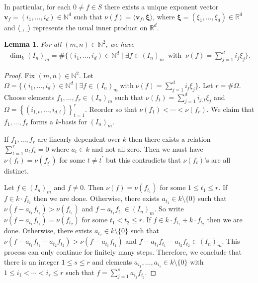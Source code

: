\documentclass[12pt,a4paper]{amsart}
\theoremstyle{plain}
\newtheorem{lemma}[theorem]{Lemma}
\theoremstyle{definition}
\numberwithin{equation}{theorem}
\begin{document}
In particular, for each $0\neq f\in S$ there exists a unique exponent vector $\mathbf{v}_f = (i_1,\ldots,i_d)\in \mathbb{N}^d$ such that $\nu(f) = \langle \mathbf{v}_f, \boldsymbol{\xi}\rangle$, where $\boldsymbol{\xi}=(\xi_1,\ldots,\xi_d)\in\mathbb{R}^d$ and $\langle\_ ,\_\rangle$ represents the usual inner product on $\mathbb{R}^d$.

\begin{lemma}\label{lem_count}
For all $(m,n)\in\mathbb{N}^2$, we have
\begin{align*}
 \dim_k {\left(I_n\right)}_m = \# \Big\{(i_1,\ldots,i_d) \in \mathbb{N}^{d} \mid \exists f\in {\left(I_n\right)}_m\;\;\text{with}\;\;\nu(f)=\sum_{j=1}^d i_j\xi_j\Big\}.
\end{align*}
\end{lemma}
\begin{proof}
Fix $(m,n)\in\mathbb{N}^2$. Let $\Omega = \big\{(i_1,\ldots,i_d) \in \mathbb{N}^{d} \mid \exists f\in {\left(I_n\right)}_m\;\text{with}\;\nu(f)=\sum_{j=1}^d i_j\xi_j\big\}$. Let $r=\#\Omega$. Choose elements $f_1,\ldots,f_r \in {\left(I_n\right)}_m$ such that $\nu(f_t) = \sum_{j=1}^d i_{j,t}\xi_j$ and $\Omega = \left\{(i_{1,t},\ldots,i_{d,t})\right\}_{t=1}^r$. Reorder so that $\nu(f_1)<\cdots<\nu(f_r)$. We claim that $f_1,\ldots,f_r$ forms a $k$-basis for ${\left(I_n\right)}_m$.

If $f_1,\ldots,f_r$ are linearly dependent over $k$ then there exists a relation $\sum_{t=1}^r a_tf_t = 0$ where $a_t\in k$ and not all zero. Then we must have $\nu(f_t)=\nu(f_{t^{\prime}})$ for some $t\neq t^{\prime}$ but this contradicts that $\nu(f_t)$'s are all distinct.

Let $f\in {\left(I_n\right)}_m$ and $f\neq 0$. Then $\nu(f)=\nu(f_{t_1})$ for some $1\leq t_1\leq r$. If $f\in k\cdot  f_{t_1}$ then we are done. Otherwise, there exists $a_{t_1}\in k\setminus \{0\}$ such that $\nu(f-a_{t_1}f_{t_1})>\nu(f_{t_1})$ and $f-a_{t_1}f_{t_1} \in {\left(I_n\right)}_m$. So write $\nu(f-a_{t_1}f_{t_1}) = \nu(f_{t_2})$ for some $t_1<t_2\leq r$. If $f \in k\cdot f_{t_1} + k\cdot f_{t_2}$ then we are done. Otherwise, there exists $a_{t_2}\in k\setminus \{0\}$ such that $\nu(f-a_{t_1}f_{t_1}-a_{t_2}f_{t_2})>\nu(f-a_{t_1}f_{t_1})$ and $f-a_{t_1}f_{t_1}-a_{t_2}f_{t_2} \in {\left(I_n\right)}_m$. This process can only continue for finitely many steps. Therefore, we conclude that there is an integer $1\leq s\leq r$ and elements $a_{i_1},\ldots,a_{i_s}\in k\setminus\{0\}$ with $1\leq i_1<\cdots<i_s\leq r$ such that $f = \sum_{j=1}^s a_{i_j}f_{i_j}$.
\end{proof}
\end{document}
